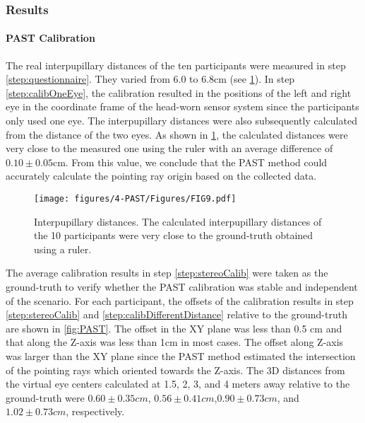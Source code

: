 \subsubsection{Results} \label{sec:4:results}
\paragraph{PAST Calibration} The real interpupillary distances of the ten participants were measured in step \ref{step:questionnaire}. They varied from 6.0 to 6.8cm (see \figurename{ \ref{fig:InterpupillaryDist}}). In step \ref{step:calibOneEye}, the calibration resulted in the positions of the left and right eye in the coordinate frame of the head-worn sensor system since the participants only used one eye. The interpupillary distances were also subsequently calculated from the distance of the two eyes. As shown in \figurename{ \ref{fig:InterpupillaryDist}}, the calculated distances were very close to the measured one using the ruler with an average difference of $0.10\pm0.05$cm. From this value, we conclude that the PAST method could accurately calculate the pointing ray origin based on the collected data. 
\begin{figure} 
	\centering
	\texttt{[image: figures/4-PAST/Figures/FIG9.pdf]}
	\caption{Interpupillary distances. The calculated interpupillary distances of the 10 participants were very close to the ground-truth obtained using a ruler.}
	\label{fig:InterpupillaryDist}
\end{figure}
The average calibration results in step \ref{step:stereoCalib} were taken as the ground-truth to verify whether the PAST calibration was stable and independent of the scenario. 
For each participant, the offsets of the calibration results in step \ref{step:stereoCalib} and \ref{step:calibDifferentDistance} relative to the ground-truth are shown in \figurename{ \ref{fig:PAST}}.
The offset in the XY plane was less than 0.5 cm and that along the Z-axis was less than 1cm in most cases. The offset along Z-axis was larger than the XY plane since the PAST method estimated the intersection of the pointing rays which oriented towards the Z-axis. %
The 3D distances from the virtual eye centers calculated at 1.5, 2, 3, and 4 meters away relative to the ground-truth were $0.60\pm0.35cm$, $0.56\pm0.41cm$,$0.90\pm0.73cm$, and $1.02\pm0.73cm$, respectively. 
